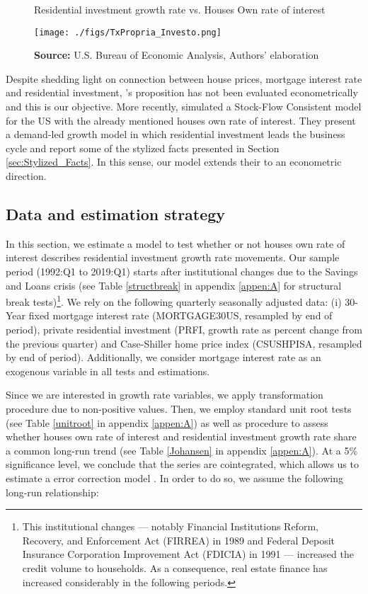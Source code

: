 \documentclass[12pt, a4paper]{article}
\begin{document}
\begin{figure}[htb]
	\centering
	\caption{Residential investment growth rate vs. Houses Own rate of interest}
	\label{propria_investo}
	\texttt{[image: ./figs/TxPropria\_Investo.png]}
	\caption*{\textbf{Source:} U.S. Bureau of Economic Analysis, Authors' elaboration}
\end{figure}

Despite shedding light on connection between house prices, mortgage interest rate and residential investment, \citeauthor*{teixeira_crescimento_2015}'s \citeyear{teixeira_crescimento_2015} proposition has not been evaluated econometrically and this is our objective.
More recently, \textcite{petrini_2021_TD} simulated a Stock-Flow Consistent model for the US with the already mentioned houses own rate of interest.
They present a demand-led growth model in which residential investment leads the business cycle and report some of the stylized facts presented in Section \ref{sec:Stylized_Facts}.
In this sense, our model extends their to an econometric direction.

\subsection{Data and estimation strategy}
\label{sec:orgb0efdf0}
\label{sec:estimation}


In this section, we estimate a model to test whether or not houses own rate of interest describes residential investment growth rate movements.
Our sample period (1992:Q1 to 2019:Q1) starts after institutional changes due to the Savings and Loans crisis (see Table \ref{structbreak} in appendix \ref{appen:A} for structural break tests)\footnote{This institutional changes --- notably Financial Institutions Reform, Recovery, and Enforcement Act (FIRREA) in 1989 and Federal Deposit Insurance Corporation Improvement Act  (FDICIA) in 1991 --- increased the credit volume to households. As a consequence, real estate finance has increased considerably in the following periods.}.
We rely on the following  quarterly seasonally adjusted data: (i) 30-Year fixed mortgage interest rate (MORTGAGE30US, resampled by end of period), private residential investment (PRFI, growth rate as percent change from the previous quarter) and Case-Shiller home price index
(CSUSHPISA, resampled by end of period).
Additionally, we consider mortgage interest rate as an exogenous variable in all tests and estimations.


Since we are interested in growth rate variables, we apply \textcite{yeo_new_2000} transformation procedure due to non-positive values.
Then, we employ standard unit root tests (see Table \ref{unitroot} in appendix \ref{appen:A}) as well as \textcite{johansen_estimation_1991} procedure to assess whether houses own rate of interest and residential investment growth rate share a common long-run trend (see Table \ref{Johansen} in appendix \ref{appen:A}).
At a 5\% significance level, we conclude that the series are cointegrated, which allows us to estimate a error correction model \cite{enders_applied_2014}.
In order to do so, we assume the following long-run relationship:
\end{document}
